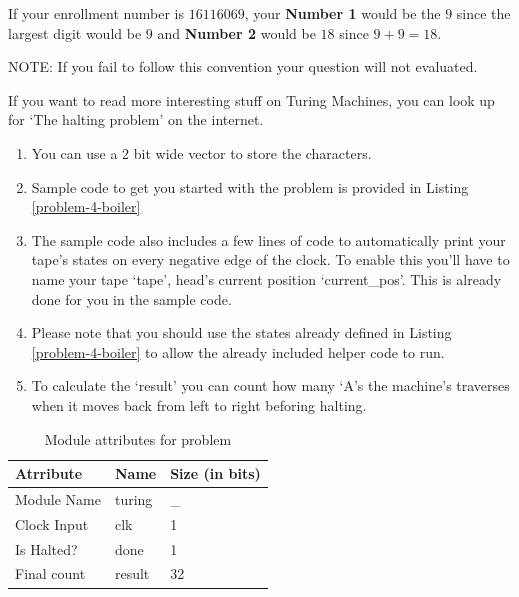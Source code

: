 \documentclass[a4paper,10pt]{article}
\theoremstyle{mytheor}
\newcommand{
  \insertverilog}[3]{
  
}
\newcounter{problemNumber}
\newcounter{hintCount} %
\newcommand{\hintcounter}[1]{%
  \refstepcounter{hintCount}%
  \thehintCount%
  \label{#1}}%
\newcounter{hintcnt}
\newcommand{\hint}[2] {
  \begin{tcolorbox}[arc=1pt,colback=blue!5!white,colframe=blue!75!black,title=\textbf{Hint - \hintcounter{#1}}]  
    #2
  \end{tcolorbox}
  \addtocounter{hintcnt}{1}
}
\begin{document}
{\begin{legal}
      If your enrollment number is $16116069$, your \textbf{Number 1}
      would be the $9$ since the largest digit would be $9$ and
      \textbf{Number 2} would be $18$ since
      $9+9=18$.

      {\color{red}NOTE:} If you fail to follow this convention your
      question will not evaluated.      
    \end{legal}
  If you want to read more interesting stuff on Turing Machines, you
  can look up for `The halting problem' on the internet.

  \hint{hint:problem-3}{ 
    \begin{enumerate}
    \item You can use a 2 bit wide vector to store the characters.
    \item Sample code to get you started with the problem is provided
      in Listing \ref{problem-4-boiler}
    \item The sample code also includes a few lines of code to
      automatically print your tape's states on every negative edge of
      the clock. To enable this you'll have to name your tape `tape',
      head's current position `current\_pos'. This is already done for 
      you in the sample code.
    \item Please note that you should use the states already defined
      in Listing \ref{problem-4-boiler} to allow the already included
      helper code to run.
    \item To calculate the `result' you can count how many `A's the 
      machine's traverses when it moves back from left to right
      beforing halting.
    \end{enumerate}
  }

  \insertverilog{./verilog_files/problem4Boiler.v}{problem-4-boiler}{Code
    to get you started with problem 4.}
     
  \begin{table}[!ht]
    \centering
    \caption{Module attributes for problem \theproblemNumber}
    \label{table:problem-4-attr}
    \renewcommand{\arraystretch}{1.1} 
    \begin{tabularx}{0.8\textwidth}{|X|X|X|}
      \hline
      \rowcolor{greatblue}
      \color{white} Atrribute & \color{white}Name & \color{white}Size (in bits) \\
      \hline
      Module Name  & turing          & \_  \\
      Clock Input  & clk             &  1  \\
      Is Halted?   & done            &  1  \\
      Final count  & result          & 32  \\
      \hline
    \end{tabularx}
  \end{table}

 }
\end{document}
